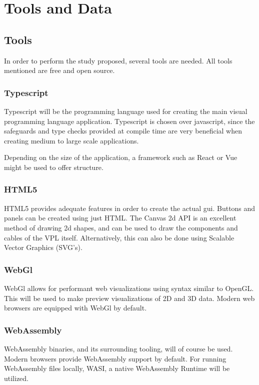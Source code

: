 \newpage
\section{Tools and Data}

\subsection{Tools}
In order to perform the study proposed, several tools are needed. All tools mentioned are free and open source.

\subsubsection*{Typescript}
Typescript will be the programming language used for creating the main visual programming language application. Typescript is chosen over javascript, since the safeguards and type checks provided at compile time are very beneficial when creating medium to large scale applications. 

Depending on the size of the application, a framework such as React or Vue might be used to offer structure.

\subsubsection*{HTML5}
HTML5 provides adequate features in order to create the actual \ac{gui}. Buttons and panels can be created using just HTML. The Canvas 2d API is an excellent method of drawing 2d shapes, and can be used to draw the components and cables of the VPL itself. Alternatively, this can also be done using Scalable Vector Graphics (SVG's). 

\subsubsection*{WebGl}
WebGl allows for performant web visualizations using syntax similar to OpenGL. This will be used to make preview visualizations of 2D and 3D data. Modern web browsers are equipped with WebGl by default. 

\subsubsection*{WebAssembly}
WebAssembly binaries, and its surrounding tooling, will of course be used. Modern browsers provide WebAssembly support by default. For running WebAssembly files locally, WASI, a native WebAssembly Runtime will be utilized. 

